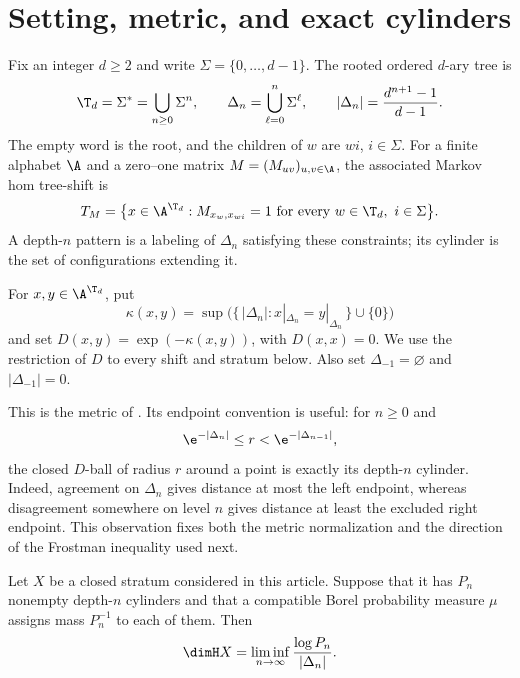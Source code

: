 \section{Setting, metric, and exact cylinders}
\label{sec:setting}

Fix an integer $d\geq2$ and write $\Sigma=\{0,\ldots,d-1\}$.  The rooted
ordered $d$-ary tree is
\[
 \T_d=\Sigma^*=\bigcup_{n\geq0}\Sigma^n,
 \qquad
 \Delta_n=\bigcup_{\ell=0}^n\Sigma^\ell,
 \qquad
 |\Delta_n|=\frac{d^{n+1}-1}{d-1}.
\]
The empty word is the root, and the children of $w$ are $wi$, $i\in\Sigma$.
For a finite alphabet $\A$ and a zero--one matrix $M=(M_{uv})_{u,v\in\A}$,
the associated Markov hom tree-shift is
\begin{equation}
 T_M=\bigl\{x\in\A^{\T_d}:M_{x_w,x_{wi}}=1
       \text{ for every }w\in\T_d,\ i\in\Sigma\bigr\}.
 \label{eq:markov-shift}
\end{equation}
A depth-$n$ pattern is a labeling of $\Delta_n$ satisfying these constraints;
its cylinder is the set of configurations extending it.

\begin{definition}
\label{def:metric}
For $x,y\in\A^{\T_d}$, put
\[
 \kappa(x,y)=\sup\bigl(\{\,|\Delta_n|:
 x|_{\Delta_n}=y|_{\Delta_n}\,\}\cup\{0\}\bigr)
\]
and set $D(x,y)=\exp(-\kappa(x,y))$, with $D(x,x)=0$.  We use the restriction
of $D$ to every shift and stratum below.  Also set
$\Delta_{-1}=\varnothing$ and $|\Delta_{-1}|=0$.
\end{definition}

This is the metric of \citet{banLaiWu2025}.  Its endpoint convention is useful:
for $n\geq0$ and
\begin{equation}
 \e^{-|\Delta_n|}\leq r<\e^{-|\Delta_{n-1}|},
 \label{eq:ball-window}
\end{equation}
the closed $D$-ball of radius $r$ around a point is exactly its depth-$n$
cylinder.  Indeed, agreement on $\Delta_n$ gives distance at most the left
endpoint, whereas disagreement somewhere on level $n$ gives distance at
least the excluded right endpoint.  This observation fixes both the metric
normalization and the direction of the Frostman inequality used next.

\begin{lemma}
\label{lem:cylinder-dimension}
Let $X$ be a closed stratum considered in this article.  Suppose that it has
$P_n$ nonempty depth-$n$ cylinders and that a compatible Borel probability
measure $\mu$ assigns mass $P_n^{-1}$ to each of them.  Then
\begin{equation}
 \dimH X=\liminf_{n\to\infty}\frac{\log P_n}{|\Delta_n|}.
 \label{eq:cylinder-dimension}
\end{equation}
\end{lemma}


